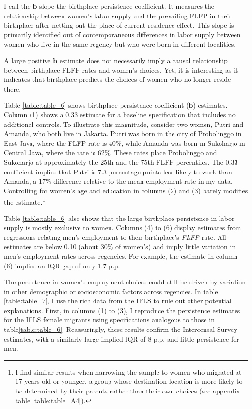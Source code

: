 I call the $\boldsymbol b$ slope the birthplace persistence coefficient. It measures the relationship between women's labor supply and the prevailing FLFP in their birthplace after netting out the place of current residence effect. This slope is primarily identified out of contemporaneous differences in labor supply between women who live in the same regency but who were born in different localities.

A large positive $\boldsymbol b$ estimate does not necessarily imply a causal relationship between birthplace FLFP rates and women's choices. Yet, it is interesting as it indicates that birthplace predicts the choices of women who no longer reside there.



\tftext{ }


Table \ref{table:table_6} shows birthplace persistence coefficient ($\boldsymbol b$) estimates. Column (1) shows a 0.33 estimate for a baseline specification that includes no additional controls. To illustrate this magnitude, consider two women, Putri and Amanda, who both live in Jakarta. Putri was born in the city of Probolinggo in East Java, where the FLFP rate is 40\%, while Amanda was born in Sukoharjo in Central Java, where the rate is 62\%. These rates place  Probolinggo and Sukoharjo at approximately the 25th and the 75th FLFP percentiles. The 0.33 coefficient implies that Putri is 7.3 percentage points less likely to work than Amanda, a 17\% difference relative to the mean employment rate in my data. Controlling for women's age and education in columns (2) and (3) barely modifies the estimate.\footnote{I find similar results when narrowing the sample to women who migrated at 17 years old or younger, a group whose destination location is more likely to be determined by their parents rather than their own choices (see appendix table \ref{table:table_A4}).}



Table \ref{table:table_6} also shows that the large birthplace persistence in labor supply is mostly exclusive to women. Columns (4) to (6) display estimates from regressions relating men's employment to their birthplace's \textit{FLFP} rate. All estimates are below 0.10 (about 30\% of women's) and imply little variation in men's employment rates across regencies. For example, the estimate in column (6) implies an IQR gap of only 1.7 p.p. 




The persistence in women's employment choices could still be driven by variation in other demographic or socioeconomic factors across regencies. In table \ref{table:table_7}, I use the rich data from the IFLS to rule out other potential explanations. First, in columns (1) to (3), I reproduce the persistence estimates for the IFLS female migrants using specifications analogous to those in  table\ref{table:table_6}. Reassuringly, these results confirm the Intercensal Survey estimates, with a similarly large implied IQR of 8 p.p. and little persistence for men.


